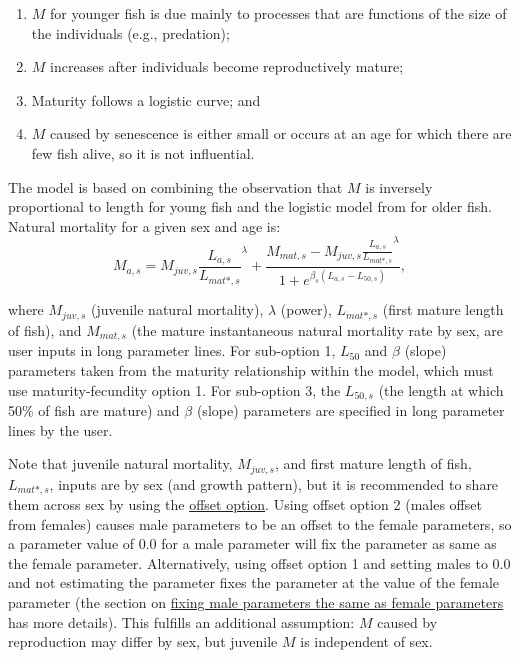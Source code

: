 \begin{enumerate}
  \item $M$ for younger fish is due mainly to processes that are functions of the size of the individuals (e.g., predation);
  \item $M$ increases after individuals become reproductively mature;
  \item Maturity follows a logistic curve; and
  \item $M$ caused by senescence is either small or occurs at an age for which there are few fish alive, so it is not influential. 
\end{enumerate}
The model is based on combining the observation that $M$ is inversely proportional to length for young fish \citep{lorenzen2000allometry} and the logistic model from \citet{lehodey2008spatial} for older fish. Natural mortality for a given sex and age is:
\begin{equation}
M_{a,s} = M_{juv,s}\frac{L_{a,s}}{L_{mat*,s}}^{\lambda} + 
\frac{M_{mat,s}-M_{juv,s}\frac{L_{a,s}}{L_{mat*,s}}^{\lambda}}{1+e^{\beta_s(L_{a,s}- L_{50,s})}},
\end{equation}

where $M_{juv,s}$ (juvenile natural mortality), $\lambda$ (power), $L_{mat*,s}$ (first mature length of fish), and $M_{mat,s}$ (the mature instantaneous natural mortality rate by sex, are user inputs in long parameter lines. For sub-option 1, $L_{50}$ and $\beta$ (slope) parameters taken from the maturity relationship within the model, which must use maturity-fecundity option 1. For sub-option 3, the $L_{50,s}$ (the length at which 50\% of fish are mature) and $\beta$ (slope) parameters are specified in long parameter lines by the user.

Note that juvenile natural mortality, $M_{juv,s}$, and first mature length of fish, $L_{mat*,s}$, inputs are by sex (and growth pattern), but it is recommended to share them across sex by using the \hyperlink{offset}{offset option}. Using offset option 2 (males offset from females) causes male parameters to be an offset to the female parameters, so a parameter value of 0.0 for a male parameter will fix the parameter as same as the female parameter. Alternatively, using offset option 1 and setting males to 0.0 and not estimating the parameter fixes the parameter at the value of the female parameter (the section on \hyperlink{male-shortcut}{fixing male parameters the same as female parameters} has more details). This fulfills an additional assumption: $M$ caused by reproduction may differ by sex, but juvenile $M$ is independent of sex.

